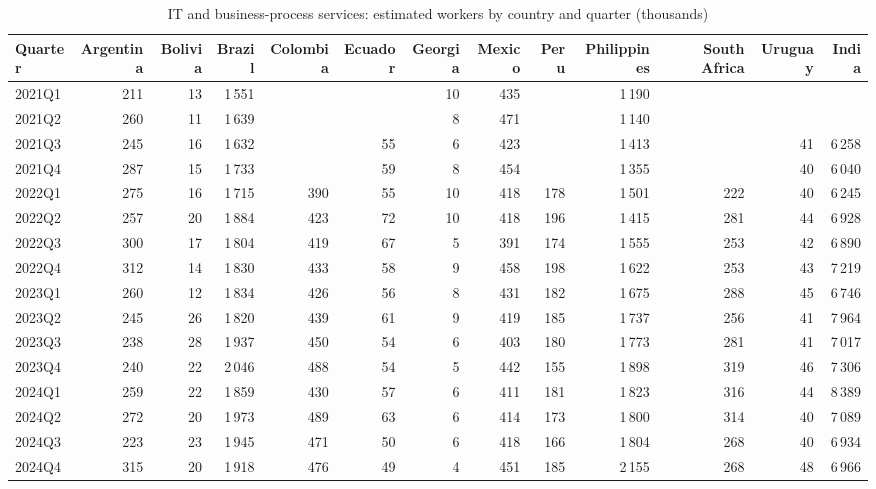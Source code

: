\renewcommand{\thetable}{A\arabic{table}}
\begin{table}
\centering
\scriptsize
\setlength{\tabcolsep}{3pt}
\begin{threeparttable}
\caption{IT and business-process services: estimated workers by country and quarter (thousands)}
\label{tab:itbpo_headcount}
\begin{tabular}{lrrrrrrrrrrrr}
\toprule
Quarter & Argentina & Bolivia & Brazil & Colombia & Ecuador & Georgia & Mexico & Peru & Philippines & South Africa & Uruguay & India \\
\midrule
2021Q1 & 211 & 13 & 1\,551 &  &  & 10 & 435 &  & 1\,190 &  &  &  \\
2021Q2 & 260 & 11 & 1\,639 &  &  & 8 & 471 &  & 1\,140 &  &  &  \\
2021Q3 & 245 & 16 & 1\,632 &  & 55 & 6 & 423 &  & 1\,413 &  & 41 & 6\,258 \\
2021Q4 & 287 & 15 & 1\,733 &  & 59 & 8 & 454 &  & 1\,355 &  & 40 & 6\,040 \\
2022Q1 & 275 & 16 & 1\,715 & 390 & 55 & 10 & 418 & 178 & 1\,501 & 222 & 40 & 6\,245 \\
2022Q2 & 257 & 20 & 1\,884 & 423 & 72 & 10 & 418 & 196 & 1\,415 & 281 & 44 & 6\,928 \\
2022Q3 & 300 & 17 & 1\,804 & 419 & 67 & 5 & 391 & 174 & 1\,555 & 253 & 42 & 6\,890 \\
2022Q4 & 312 & 14 & 1\,830 & 433 & 58 & 9 & 458 & 198 & 1\,622 & 253 & 43 & 7\,219 \\
2023Q1 & 260 & 12 & 1\,834 & 426 & 56 & 8 & 431 & 182 & 1\,675 & 288 & 45 & 6\,746 \\
2023Q2 & 245 & 26 & 1\,820 & 439 & 61 & 9 & 419 & 185 & 1\,737 & 256 & 41 & 7\,964 \\
2023Q3 & 238 & 28 & 1\,937 & 450 & 54 & 6 & 403 & 180 & 1\,773 & 281 & 41 & 7\,017 \\
2023Q4 & 240 & 22 & 2\,046 & 488 & 54 & 5 & 442 & 155 & 1\,898 & 319 & 46 & 7\,306 \\
2024Q1 & 259 & 22 & 1\,859 & 430 & 57 & 6 & 411 & 181 & 1\,823 & 316 & 44 & 8\,389 \\
2024Q2 & 272 & 20 & 1\,973 & 489 & 63 & 6 & 414 & 173 & 1\,800 & 314 & 40 & 7\,089 \\
2024Q3 & 223 & 23 & 1\,945 & 471 & 50 & 6 & 418 & 166 & 1\,804 & 268 & 40 & 6\,934 \\
2024Q4 & 315 & 20 & 1\,918 & 476 & 49 & 4 & 451 & 185 & 2\,155 & 268 & 48 & 6\,966 \\

\end{tabular}
\end{threeparttable}
\end{table}
